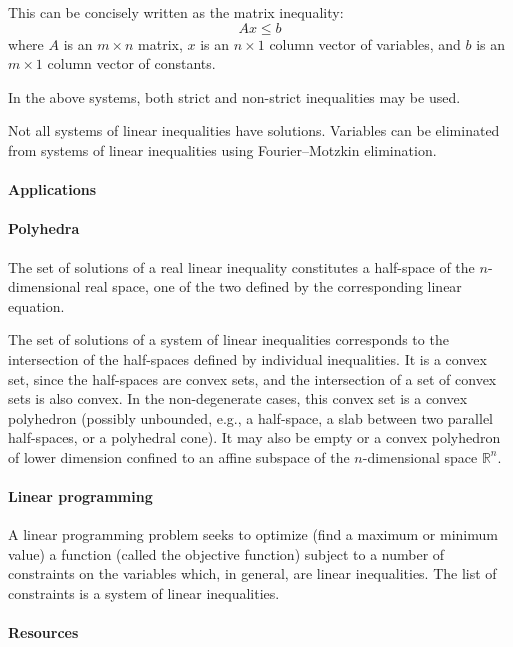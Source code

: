 This can be concisely written as the matrix inequality:
$$
Ax \leq b
$$
where $A$ is an $m \times n$ matrix, $x$ is an $n \times 1$ column vector of variables, and $b$ is an $m \times 1$ column vector of constants.

In the above systems, both strict and non-strict inequalities may be used.

Not all systems of linear inequalities have solutions. Variables can be eliminated from systems of linear inequalities using Fourier–Motzkin elimination.

\paragraph{Applications}

\paragraph{Polyhedra}

The set of solutions of a real linear inequality constitutes a half-space of the $n$-dimensional real space, one of the two defined by the corresponding linear equation.

The set of solutions of a system of linear inequalities corresponds to the intersection of the half-spaces defined by individual inequalities. It is a convex set, since the half-spaces are convex sets, and the intersection of a set of convex sets is also convex. In the non-degenerate cases, this convex set is a convex polyhedron (possibly unbounded, e.g., a half-space, a slab between two parallel half-spaces, or a polyhedral cone). It may also be empty or a convex polyhedron of lower dimension confined to an affine subspace of the $n$-dimensional space $\mathbb{R}^n$.

\paragraph{Linear programming}

A linear programming problem seeks to optimize (find a maximum or minimum value) a function (called the objective function) subject to a number of constraints on the variables which, in general, are linear inequalities. The list of constraints is a system of linear inequalities.

\paragraph{Resources}

